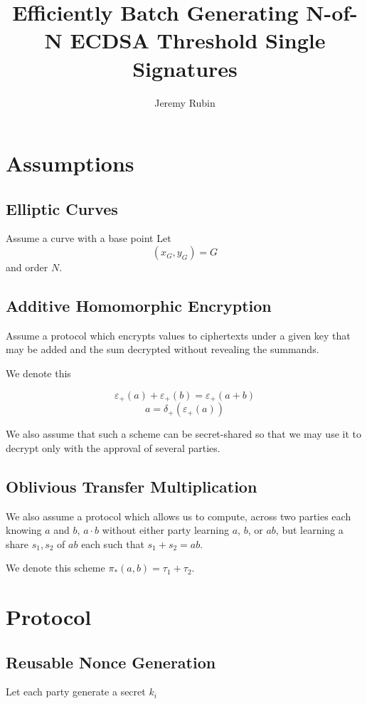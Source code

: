 \documentclass{article}
\author{Jeremy Rubin}
\title{Efficiently Batch Generating N-of-N ECDSA Threshold Single Signatures}
\newcommand{\addencrypt}{\varepsilon_{+}}
\newcommand{\adddecrypt}{\delta_{+}}
\newcommand{\mulOT}{\pi_{*}}
\begin{document}
\maketitle

\section{Assumptions}


\subsection{Elliptic Curves}

Assume a curve with a base point 
Let $$(x_G, y_G) = G$$
and order $N$.

\subsection{Additive Homomorphic Encryption}

Assume a protocol which encrypts values to ciphertexts under a given key that may be added
and the sum decrypted without revealing the summands.

We denote this

$$\addencrypt(a) + \addencrypt(b) = \addencrypt(a+b)$$
$$ a = \adddecrypt(\addencrypt(a)) $$

We also assume that such a scheme can be secret-shared so that we may use it to decrypt only with the approval of several parties.


\subsection{Oblivious Transfer Multiplication}

We also assume a protocol which allows us to compute, across two parties each knowing $a$ and $b$, $a\cdot b$ without either party learning $a$, $b$, or $ab$, but learning a share $s_1, s_2$ of $ab$ each such that $s_1+s_2 = ab$.

We denote this scheme $\mulOT(a,b) = \tau_1 + \tau_2$. 

\section{Protocol}

\subsection{Reusable Nonce Generation}
Let each party generate a secret $k_i$
\end{document}
